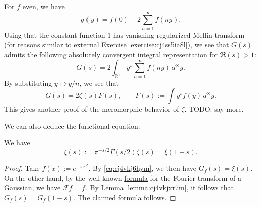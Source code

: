 \documentclass[reqno]{amsart}  \numberwithin{theorem}{section} \numberwithin{equation}{section}
\begin{document}
For $f$ even, we have
\begin{equation*}
g(y) = f(0) + 2 \sum_{n = 1 }^\infty f(n y).
\end{equation*}
Using that the constant function $1$ has vanishing regularized Mellin transform (for reasons similar to external Exercise \ref{exercise:cj4ss5ia8l}), we see that $G(s)$ admits the following absolutely convergent integral representation for $\Re(s) > 1$:
\begin{equation*}
G(s) = 2 \int_{\mathbb{R}^+ } y^s \sum_{n = 1 }^\infty f (n y ) \,d^\times y.
\end{equation*}
By substituting $y \mapsto y / n$, we see that
\begin{equation*}
G(s) = 2 \zeta(s) F(s), \qquad F(s) := \int y^s f(y) \,d^\times y.
\end{equation*}
This gives another proof of the meromorphic behavior of $\zeta$.  TODO: say more.

We can also deduce the functional equation:
\begin{theorem}
  We have
  \begin{equation*}
\xi(s) := \pi^{- s / 2 } \Gamma (s/ 2 ) \zeta(s) = \xi (1 - s).
\end{equation*}
\end{theorem}
\begin{proof}
  Take $f(x) := e^{- \pi x^2}$.  By \eqref{eq:cj4vkj6hym}, we then have $G_f(s) = \xi(s)$.  On the other hand, by the well-known \href{https://mathworld.wolfram.com/FourierTransformGaussian.html}{formula} for the Fourier transform of a Gaussian, we have $\mathcal{F} f = f$.  By Lemma \ref{lemma:cj4vkjxr7m}, it follows that $G_f (s) = G_f (1 - s)$.  The claimed formula follows.
\end{proof}
\end{document}

